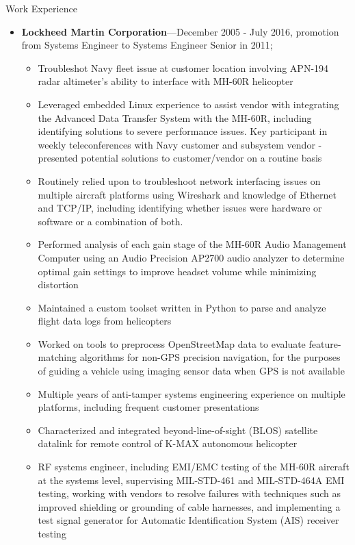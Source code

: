 \documentclass[10pt,oneside]{article}
\newenvironment{ressection}[1]{
	\vspace{4pt}
	{\Large#1}
	\begin{itemize}
	\vspace{3pt}
}{
	\end{itemize}
}
\newcommand{\ressubitem}[1]{
	\vspace{-1pt}
	\item \begin{flushleft} #1 \end{flushleft}
}
\newcommand{\resbigitem}[3]{
	\vspace{-5pt}
	\item
	\textbf{#1}---#2; \quad \textit{#3}
}
\newenvironment{ressubsec}[3]{
	\resbigitem{#1}{#2}{#3}
	\vspace{-2pt}
	\begin{itemize}
}{
	\end{itemize}
}
\newenvironment{ressection}[1]{
	\vspace{4pt}
	{\fontfamily{phv}\selectfont\Large#1}
	\begin{itemize}
	\vspace{3pt}
}{
	\end{itemize}
}
\newcommand{\ressubitem}[1]{
	\vspace{-1pt}
	\item \begin{flushleft} #1 \end{flushleft}
}
\newcommand{\resbigitem}[2]{
	\vspace{-5pt}
	\item
	\textbf{#1}---\textit{#2}
}
\newenvironment{ressubsec}[2]{
	\resbigitem{#1}{#2}
	\vspace{-2pt}
	\begin{itemize}
}{
	\end{itemize}
}
\begin{document}
\begin{ressection}{Work Experience}

	\begin{ressubsec}{Lockheed Martin Corporation}{December 2005 - July 2016, promotion from Systems Engineer to Systems Engineer Senior in 2011}
          \ressubitem{Display test and measurement subject matter expert - sunlight readability evaluation, night vision compatibility evaluation, contrast and luminance measurement, chromaticity measurement in support of multiple platforms}
	  \ressubitem{Troubleshot Navy fleet issue at customer location involving APN-194 radar altimeter's ability to interface with MH-60R helicopter}
          \ressubitem{Leveraged embedded Linux experience to assist vendor with integrating the Advanced Data Transfer System with the MH-60R, including identifying solutions to severe performance issues.  Key participant in weekly teleconferences with Navy customer and subsystem vendor - presented potential solutions to customer/vendor on a routine basis}
          \ressubitem{Routinely relied upon to troubleshoot network interfacing issues on multiple aircraft platforms using Wireshark and knowledge of Ethernet and TCP/IP, including identifying whether issues were hardware or software or a combination of both.}
          \ressubitem{Performed analysis of each gain stage of the MH-60R Audio Management Computer using an Audio Precision AP2700 audio analyzer to determine optimal gain settings to improve headset volume while minimizing distortion}
          \ressubitem{Maintained a custom toolset written in Python to parse and analyze flight data logs from helicopters}
          \ressubitem{Worked on tools to preprocess OpenStreetMap data to evaluate feature-matching algorithms for non-GPS precision navigation, for the purposes of guiding a vehicle using imaging sensor data when GPS is not available}
          \ressubitem{Multiple years of anti-tamper systems engineering experience on multiple platforms, including frequent customer presentations}
          \ressubitem{Characterized and integrated beyond-line-of-sight (BLOS) satellite datalink for remote control of K-MAX autonomous helicopter}
          \ressubitem{RF systems engineer, including EMI/EMC testing of the MH-60R aircraft at the systems level, supervising MIL-STD-461 and MIL-STD-464A EMI testing, working with vendors to resolve failures with techniques such as improved shielding or grounding of cable harnesses, and implementing a test signal generator for Automatic Identification System (AIS) receiver testing}
	\end {ressubsec}


\end{ressection}
\end{document}
